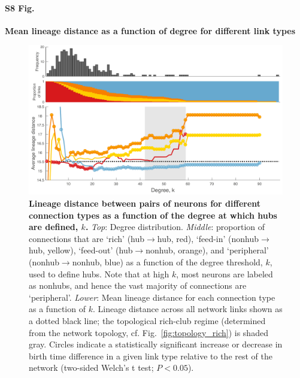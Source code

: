 \documentclass[10pt,letterpaper]{article}
\begin{document}
\paragraph*{S8 Fig.}
{\bf Mean lineage distance as a function of degree for different link types}
\begin{figure}[!h]

\centering
    \includegraphics[width=1\textwidth]{Lineage.pdf}
    \caption{
    \textbf{Lineage distance between pairs of neurons for different connection types as a function of the degree at which hubs are defined, $k$.}
    \emph{Top}: Degree distribution.
\emph{Middle}: proportion of connections that are `rich' (hub$\rightarrow$hub, red), `feed-in' (nonhub$\rightarrow$hub, yellow), `feed-out' (hub$\rightarrow$nonhub, orange), and `peripheral' (nonhub$\rightarrow$nonhub, blue) as a function of the degree threshold, $k$, used to define hubs.
Note that at high $k$, most neurons are labeled as nonhubs, and hence the vast majority of connections are `peripheral'.
\emph{Lower}: Mean lineage distance for each connection type as a function of $k$.
Lineage distance across all network links shown as a dotted black line; the topological rich-club regime (determined from the network topology, cf. Fig.~\ref{fig:topology_rich}) is shaded gray.
Circles indicate a statistically significant increase or decrease in birth time difference in a given link type relative to the rest of the network (two-sided Welch’s t test; $P < 0.05$).
}
\label{Lineagek}
\end{figure}
\end{document}
